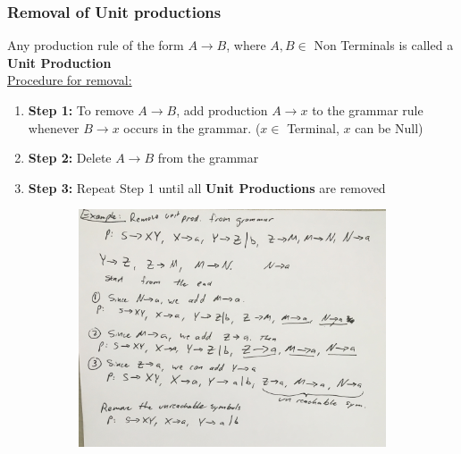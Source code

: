 \documentclass[20pt]{article} %
\begin{document}
\subsubsection{Removal of \textbf{Unit productions}}
Any production rule of the form $A \rightarrow B$, where $A, B \in$ Non Terminals is called a \textbf{Unit Production}\\
\underline{Procedure for removal:}
\begin{enumerate}
\item \textbf{Step 1:} To remove $A\rightarrow B$, add production $A \rightarrow x$ to the grammar rule whenever $B \rightarrow x$ occurs in the grammar. ($x \in $ Terminal, $x$ can be Null)
\item \textbf{Step 2:} Delete $A \rightarrow B$ from the grammar
\item \textbf{Step 3:} Repeat Step 1 until all \textbf{Unit Productions} are removed
\end{enumerate} 
\begin{figure}[!htbp]
  	\centering
   	\begin{subfigure}[p]{1.0\linewidth}
    	\includegraphics[width=\linewidth]{./figures/f-3.jpg}
   	\end{subfigure}
\end{figure}
\end{document}
